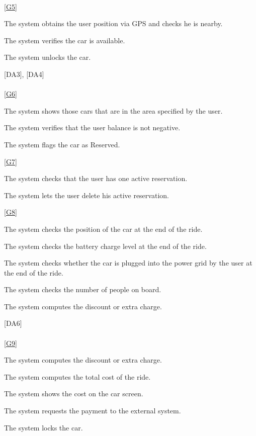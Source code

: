 \documentclass[11pt,a4paper]{report}
\begin{document}
\noindent\\
\ref{G5} \\
\begin{Req}[resume]
\item The system obtains the user position via GPS and checks he is nearby.
\item The system verifies the car is available.
\item The system unlocks the car.
\end{Req}
\hspace{0.4cm}[DA3], [DA4]\\
\noindent\\
\ref{G6} \\
\begin{Req}[resume]
\item The system shows those cars that are in the area specified by the user.
\item The system verifies that the user balance is not negative.
\item The system flags the car as Reserved.
\end{Req}
\noindent\ref{G7} \\
\begin{Req}[resume]
\item The system checks that the user has one active reservation.
\item The system lets the user delete his active reservation.
\end{Req}
\noindent\ref{G8} \\
\begin{Req}[resume]
\item The system checks the position of the car at the end of the ride.
\item The system checks the battery charge level at the end of the ride.
\item The system checks whether the car is plugged into the power grid by the user at the end of the ride.
\item The system checks the number of people on board.
\item The system computes the discount or extra charge.
\end{Req}
\hspace{0.4cm}[DA6]\\
\noindent\\\ref{G9} \\
\begin{Req}[start = 23]
\item The system computes the discount or extra charge.
\item The system computes the total cost of the ride.
\item The system shows the cost on the car screen.
\item The system requests the payment to the external system.
\item The system locks the car.
\end{Req}
\end{document}
